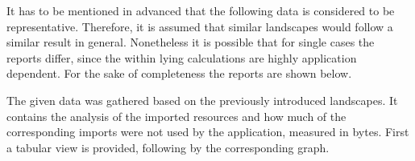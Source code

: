 It has to be mentioned in advanced that the following data is considered to be representative. Therefore, it is assumed that similar landscapes would follow a similar result in general. Nonetheless it is possible that for single cases the reports differ, since the within lying calculations are highly application dependent.
For the sake of completeness the reports are shown below.

The given data was gathered based on the previously introduced landscapes. It contains the analysis of the imported resources and how much of the corresponding imports were not used by the application, measured in bytes. First a tabular view is provided, following by the corresponding graph.

\scriptsize 
\setlength{\mycolwidthtwo}{\dimexpr \textwidth/5 - 2\tabcolsep}%

